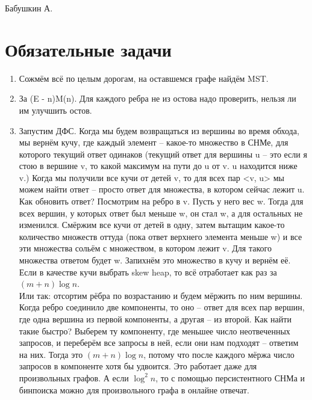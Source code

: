 \documentclass[12pt]{article}
\begin{document}
    \def\t{\texttt}
    
    Бабушкин А.
    
    \section{Обязательные задачи}
    
    \begin{enumerate}
        \setlength{\parskip}{0pt} 
        \setlength{\itemsep}{0pt} 
        \item Сожмём всё по целым дорогам, на оставшемся графе найдём MST. \\
        \item За (E - n)M(n). Для каждого ребра не из остова надо проверить, нельзя ли им улучшить остов. \\
        \item Запустим ДФС. Когда мы будем возвращаться из вершины во время обхода, мы вернём кучу, где каждый элемент -- какое-то множество 
        в СНМе, для которого текущий ответ одинаков (текущий ответ для вершины u -- это если я стою в вершине v, то какой максимум на пути до 
        u от v. u находится ниже v.) Когда мы получили все кучи от детей v, то для всех пар <v, u> мы можем найти ответ -- просто ответ для множества, 
        в котором сейчас лежит u. Как обновить ответ? Посмотрим на ребро в v. Пусть у него вес w. Тогда для всех вершин, у которых ответ был меньше w, 
        он стал w, а для остальных не изменился. Смёржим все кучи от детей в одну, затем вытащим какое-то количество множеств оттуда (пока ответ 
        верхнего элемента меньше w) и все эти множества сольём с множеством, в котором лежит v. Для такого множества ответом будет w. Запихнём 
        это множество в кучу и вернём её. Если в качестве кучи выбрать skew heap, то всё отработает как раз за $(m+n)\log n$. \\
        Или так: отсортим рёбра по возрастанию и будем мёржить по ним вершины. Когда ребро соединило две компоненты, то оно -- ответ для всех пар вершин, 
        где одна вершина из первой компоненты, а другая -- из второй. Как найти такие быстро? Выберем ту компоненту, где меньшее число неотвеченных запросов, 
        и переберём все запросы в ней, если они нам подходят -- ответим на них. Тогда это $(m+n)\log n$, потому что после каждого мёржа число 
        запросов в компоненте хотя бы удвоится. Это работает даже для произвольных графов. А если $\log^2 n$, то с помощью персистентного СНМа 
        и бинпоиска можно для произвольного графа в онлайне отвечат. \\

\end{enumerate}
\end{document}
